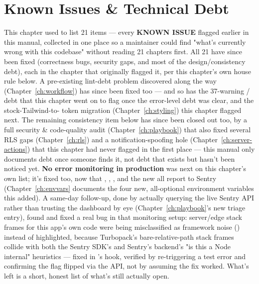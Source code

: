 \chapter{Known Issues \& Technical Debt}
\label{ch:known-issues}

This chapter used to list 21 items — every \textbf{KNOWN ISSUE} flagged earlier in this manual, collected in one place so a maintainer could find "what's currently wrong with this codebase" without reading 21 chapters first. All 21 have since been fixed (correctness bugs, security gaps, and most of the design/consistency debt), each in the chapter that originally flagged it, per this chapter's own house rule below. A pre-existing lint-debt problem discovered along the way (Chapter~\ref{ch:workflow}) has since been fixed too — and so has the 37-warning / debt that this chapter went on to flag once the error-level debt was clear, and the stock-Tailwind-to- token migration (Chapter~\ref{ch:styling}) this chapter flagged next. The remaining  consistency item below has since been closed out too, by a full security \& code-quality audit (Chapter~\ref{ch:playbook}) that also fixed several RLS gaps (Chapter~\ref{ch:rls}) and a notification-spoofing hole (Chapter~\ref{ch:server-actions}) that this chapter had never flagged in the first place — this manual only documents debt once someone finds it, not debt that exists but hasn't been noticed yet. \textbf{No error monitoring in production} was next on this chapter's own list; it's fixed too, now that , , , and the new  all report to Sentry (Chapter~\ref{ch:envvars} documents the four new, all-optional environment variables this added). A same-day follow-up, done by actually querying the live Sentry API rather than trusting the dashboard by eye (Chapter~\ref{ch:playbook}'s new triage entry), found and fixed a real bug in that monitoring setup: server/edge stack frames for this app's own code were being misclassified as framework noise () instead of highlighted, because Turbopack's bare-relative-path stack frames collide with both the Sentry SDK's and Sentry's backend's "is this a Node internal" heuristics — fixed in 's  hook, verified by re-triggering a test error and confirming the flag flipped via the API, not by assuming the fix worked. What's left is a short, honest list of what's still actually open.

